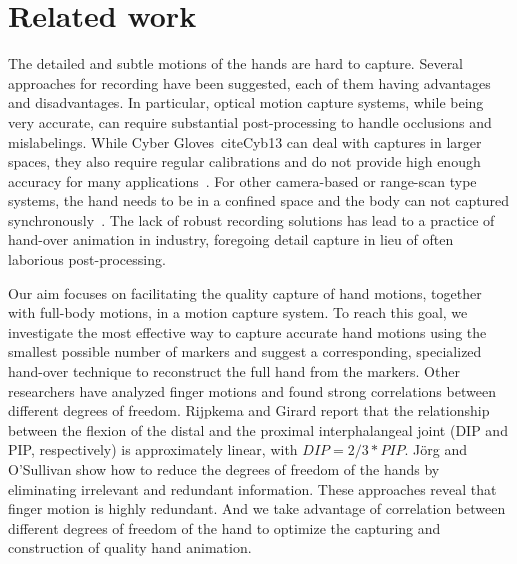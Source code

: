 
\section{Related work}

The detailed and subtle motions of the hands are hard to capture. Several approaches for recording have been suggested, each of them having advantages and disadvantages. In particular, optical motion capture systems, while being very accurate, can require substantial post-processing to handle occlusions and mislabelings. While Cyber Gloves~\short cite{Cyb13} can deal with captures in larger spaces, they also require regular calibrations and do not provide high enough accuracy for many applications~\cite{KahZacKle04}. For other camera-based or range-scan type systems, the hand needs to be in a confined space and the body can not captured synchronously~\cite{WanPop09,ZhaChaXu12}.   The lack of robust recording solutions has lead to a practice of
hand-over animation in industry, foregoing detail capture in lieu of often laborious post-processing.

Our aim focuses on facilitating the quality capture of hand motions, together with full-body motions, in a motion capture system. To reach this goal, we investigate the most effective way to capture accurate hand motions using the smallest possible number of markers and suggest a corresponding, specialized hand-over technique to reconstruct the full hand from the markers. Other researchers have analyzed finger motions and found strong correlations between different degrees of freedom. Rijpkema and Girard  report that the relationship between the flexion of the distal and the proximal interphalangeal joint (DIP and PIP, respectively) is approximately linear, with $DIP=2/3*PIP$. J\"{o}rg and O'Sullivan  show how to reduce the degrees of freedom of the hands by eliminating irrelevant and redundant information. These approaches reveal that finger motion is highly redundant. And we take advantage of  correlation between different degrees of freedom of the hand to optimize the capturing and construction of quality hand animation.

